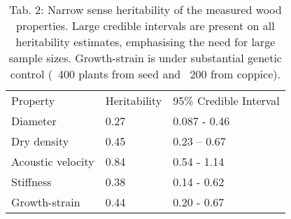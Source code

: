 
\begin{table}
\centering
\caption{Tab. 2: Narrow sense heritability of the measured wood properties. Large credible intervals are present on all heritability estimates, emphasising the need for large sample sizes. Growth-strain is under substantial genetic control (~400 plants from seed and ~200 from coppice).}
\begin{tabular}{lll}
Property          & Heritability & 95\% Credible Interval \\
Diameter          & 0.27         & 0.087 - 0.46           \\
Dry density       & 0.45         & 0.23 – 0.67            \\
Acoustic velocity & 0.84         & 0.54 - 1.14            \\
Stiffness         & 0.38         & 0.14 - 0.62            \\
Growth-strain     & 0.44         & 0.20 - 0.67           
\end{tabular}
\end{table}